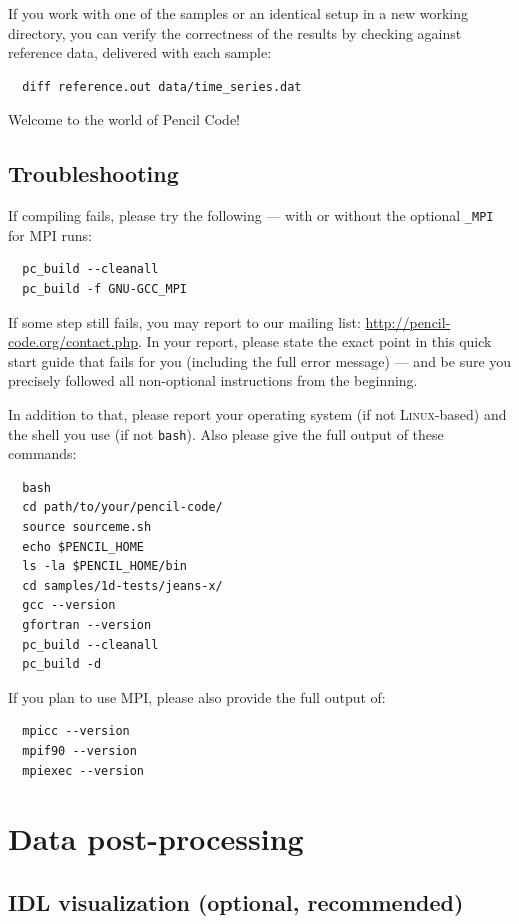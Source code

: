 \documentclass[a4paper,12pt]{article}
\newcommand{\command}[1]{\texttt{#1}}
\newcommand{\name}[1]{\textsc{#1}}
\begin{document}
If you work with one of the samples or an identical setup in a new working directory, you can verify the correctness of the results
by checking against reference data, delivered with each sample:
\begin{verbatim}
  diff reference.out data/time_series.dat
\end{verbatim}

Welcome to the world of Pencil Code!

\subsection{Troubleshooting}

If compiling fails, please try the following --- with or without the optional \command{\_MPI} for \name{MPI} runs:
\begin{verbatim}
  pc_build --cleanall
  pc_build -f GNU-GCC_MPI
\end{verbatim}

If some step still fails, you may report to our mailing list: \url{http://pencil-code.org/contact.php}.
In your report, please state the exact point in this quick start guide that fails for you (including the full error message) --- and be sure you precisely followed all non-optional instructions from the beginning.

In addition to that, please report your operating system (if not \name{Linux}-based) and the shell you use (if not \command{bash}).
Also please give the full output of these commands:
\begin{verbatim}
  bash
  cd path/to/your/pencil-code/
  source sourceme.sh
  echo $PENCIL_HOME
  ls -la $PENCIL_HOME/bin
  cd samples/1d-tests/jeans-x/
  gcc --version
  gfortran --version
  pc_build --cleanall
  pc_build -d
\end{verbatim}

If you plan to use \name{MPI}, please also provide the full output of:
\begin{verbatim}
  mpicc --version
  mpif90 --version
  mpiexec --version
\end{verbatim}

\section{Data post-processing}

\subsection{IDL visualization (optional, recommended)}
\end{document}
